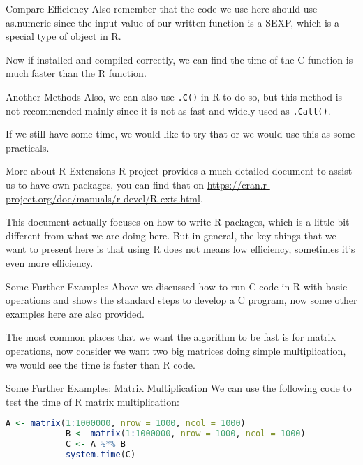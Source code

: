 \documentclass[aspectratio=169]{beamer}
\begin{document}
    \begin{frame}{Compare Efficiency}
        Also remember that the code we use here should use as.numeric since the input value of our written function is a SEXP, which is a special type of object in R.\par
        Now if installed and compiled correctly, we can find the time of the C function is much faster than the R function.\par
    \end{frame}

    \begin{frame}{Another Methods}
        Also, we can also use \texttt{.C()} in R to do so, but this method is not recommended mainly since it is not as fast and widely used as \texttt{.Call()}.\par
        If we still have some time, we would like to try that or we would use this as some practicals.\par
    \end{frame}

    \begin{frame}{More about R Extensions}
        R project provides a much detailed document to assist us to have own packages, you can find that on \url{https://cran.r-project.org/doc/manuals/r-devel/R-exts.html}.\par
        This document actually focuses on how to write R packages, which is a little bit different from what we are doing here. But in general, the key things that we want to present here is that using R does not means low efficiency, sometimes it's even more efficiency.\par
    \end{frame}

    \begin{frame}{Some Further Examples}
        Above we discussed how to run C code in R with basic operations and shows the standard steps to develop a C program, now some other examples here are also provided.\par
        The most common places that we want the algorithm to be fast is for matrix operations, now consider we want two big matrices doing simple multiplication, we would see the time is faster than R code.\par
    \end{frame}

    \begin{frame}[fragile]{Some Further Examples: Matrix Multiplication}
        We can use the following code to test the time of R matrix multiplication:\par
        \begin{lstlisting}[language=R]
            A <- matrix(1:1000000, nrow = 1000, ncol = 1000)
            B <- matrix(1:1000000, nrow = 1000, ncol = 1000)
            C <- A %*% B
            system.time(C)
        \end{lstlisting}
    \end{frame}
\end{document}
